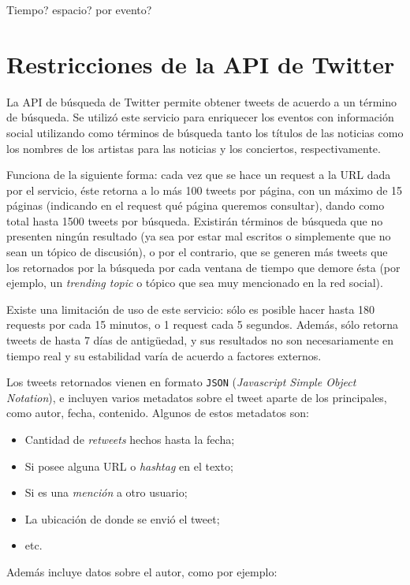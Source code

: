 \documentclass[upright, contnum]{umemoria}
\begin{document}
Tiempo? espacio? por evento?

\section{Restricciones de la API de Twitter}
\label{sec-6.4}


   La API de búsqueda de Twitter permite obtener tweets de acuerdo a un
   término de búsqueda. Se utilizó este servicio para enriquecer los
   eventos con información social utilizando como términos de búsqueda
   tanto los títulos de las noticias como los nombres de los artistas
   para las noticias y los conciertos, respectivamente. 
   
   Funciona de la siguiente forma: cada vez que se hace un request a la
   URL dada por el servicio, éste retorna a lo más 100 tweets por página, con un
   máximo de 15 páginas (indicando en el request qué página queremos
   consultar), dando como total hasta 1500 tweets por búsqueda. Existirán
   términos de búsqueda que no presenten ningún resultado  (ya sea por
   estar mal escritos o simplemente que no sean un tópico de discusión), o por
   el contrario, que se generen más tweets que los retornados por la
   búsqueda por cada ventana de tiempo que demore ésta (por ejemplo, un
   \emph{trending topic} o tópico que sea muy mencionado en la red social).
   
   Existe una limitación de uso de este servicio: sólo es posible hacer
   hasta 180 requests por cada 15 minutos, o 1 request cada 5
   segundos. Además, sólo retorna tweets de hasta 7 días de antigüedad, y
   sus resultados no son necesariamente en tiempo real y su estabilidad
   varía de acuerdo a factores externos.
   
   Los tweets retornados vienen en formato \texttt{JSON} (\emph{Javascript Simple Object Notation}),
   e incluyen varios metadatos sobre el tweet aparte de los principales,
   como autor, fecha, contenido. Algunos de estos metadatos son:
   
\begin{itemize}
\item Cantidad de \emph{retweets} hechos hasta la fecha;
\item Si posee alguna URL o \emph{hashtag} en el texto;
\item Si es una \emph{mención} a otro usuario;
\item La ubicación de donde se envió el tweet;
\item etc.
\end{itemize}
  Además incluye datos sobre el autor, como por ejemplo:
\end{document}
